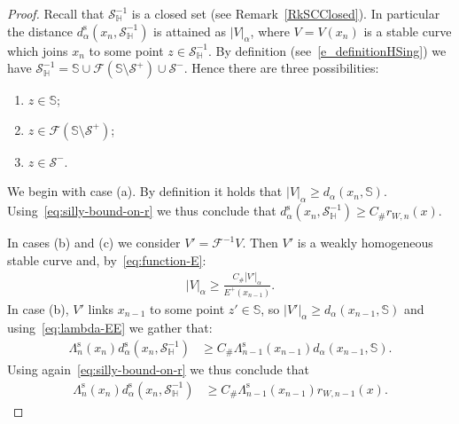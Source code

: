 \documentclass[10pt]{amsart}
\theoremstyle{definition}\newtheorem{defi}[theo]{Definition}\newtheorem{rema}[theo]{Remark}\newtheorem{exam}[theo]{Example}\newtheorem{exem}[theo]{Example}\newtheorem{nota}[theo]{Notation}
\newcommand{\const}{C_\#}
\newcommand{\inv}{^{-1}}
\newcommand{\stable}{\text{s}}
\newcommand{\hhs}{\mathbb{S}}
\newcommand{\homo}{\mathbb{H}}
\newcommand{\cm}{\mathcal{F}}
\newcommand{\dadm}[1]{\dadmPrivate^{#1}}
\newcommand{\dadmPrivate}{d\adm}
\newcommand{\ds}{\dadmPrivate^{\stable}}
\newcommand{\singPrivate}{\mathcal{S}}
\newcommand{\hsing}[1]{{\singPrivate}_\homo^{#1}}
\newcommand{\singForward}[1]{\singPrivate^+_{#1}}
\newcommand{\singBackward}[1]{\singPrivate^-_{#1}}
\newcommand{\adm}{_{\alpha^{+}}}
\newcommand*\DS{\displaystyle}
\renewcommand{\adm}{_{\alpha}}
\renewcommand{\dadm}{d\adm}
\newcommand*{\relabel}{\renewcommand{\labelenumi}{(\theenumi)}}
\newcommand*{\alphenumi}{\renewcommand*{\theenumi}{\alph{enumi}}\relabel}
\begin{document}
\begin{proof}
Recall that $\hsing{-1}$ is a closed set (see Remark~\ref{RkSCClosed}). In particular the distance $\ds(x_{n},\hsing{-1})$ is attained as $|V|\adm$, where $V = V(x_{n})$ is a stable curve which joins $x_{n}$ to some point $z\in\hsing{-1}$. By definition (see~\eqref{e_definitionHSing}) we have $\DS \hsing{-1} = \hhs \cup \cm(\hhs\setminus\singForward{}) \cup \singBackward{}. $ Hence there are three possibilities:
\begin{enumerate}\alphenumi
\item\label{prf7.9.a} $z\in\hhs$; 
\item\label{prf7.9.b} $z\in\cm(\hhs\setminus\singForward{})$; 
\item\label{prf7.9.c} $z\in\singBackward{}$.
\end{enumerate}

We begin with case (a). By definition it holds that $|V|\adm\ge \dadm(x_{n},\hhs)$. Using~\eqref{eq:silly-bound-on-r} we thus conclude that $\ds(x_n,\hsing{-1})\ge \const r_{W,n}(x)$.

In cases (b) and (c) we consider $V' = \cm\inv V$. Then $V'$ is a weakly homogeneous stable curve and, by~\eqref{eq:function-E}:
\begin{align*}
|V|\adm\ge \frac{\const |V'|\adm}{E^{+}(x_{n-1})}.
\end{align*}
In case (b), $V'$ links $x_{n-1}$ to some point $z'\in\hhs$, so $|V'|\adm\ge\dadm(x_{n-1},\hhs)$ and using~\eqref{eq:lambda-EE} we gather that:
\begin{align*}
\Lambda^{\stable}_{n}(x_{n})\ds(x_{n},\hsing{-1})&\ge \const\Lambda^{\stable}_{n-1}(x_{n-1})\dadm(x_{n-1},\hhs).
\end{align*}
Using again~\eqref{eq:silly-bound-on-r} we thus conclude that
\begin{align*}
\Lambda^{\stable}_{n}(x_{n})\ds\left(x_{n},\hsing{-1}\right)&\ge \const\Lambda^{\stable}_{n-1}(x_{n-1})r_{W,n-1}(x).
\end{align*}


\end{proof}
\end{document}
